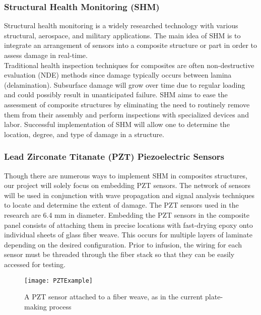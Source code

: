 \documentclass[12pt,letterpaper,notitlepage]{article}
\begin{document}
\subsubsection{Structural Health Monitoring (SHM)}
Structural health monitoring is a widely researched technology with various structural, aerospace, and military applications. The main idea of SHM is to integrate an arrangement of sensors into a composite structure or part in order to assess damage in real-time.\\

Traditional health inspection techniques for composites are often non-destructive evaluation (NDE) methods since damage typically occurs between lamina (delamination).  Subsurface damage will grow over time due to regular loading and could possibly result in unanticipated failure. SHM aims to ease the assessment of composite structures by eliminating the need to routinely remove them from their assembly and perform inspections with specialized devices and labor. Successful implementation of SHM will allow one to determine the location, degree, and type of damage in a structure.\\

\subsubsection{Lead Zirconate Titanate (PZT) Piezoelectric Sensors}
Though there are numerous ways to implement SHM in composites structures, our project will solely focus on embedding PZT sensors. The network of sensors will be used in conjunction with wave propagation and signal analysis techniques to locate and determine the extent of damage. The PZT sensors used in the research are 6.4 mm in diameter. Embedding the PZT sensors in the composite panel consists of attaching them in precise locations with fast-drying epoxy onto individual sheets of glass fiber weave. This occurs for multiple layers of laminate depending on the desired configuration. Prior to infusion, the wiring for each sensor must be threaded through the fiber stack so that they can be easily accessed for testing.
\begin{figure}[hpbt]
\centering
\texttt{[image: PZTExample]}
\caption{A PZT sensor attached to a fiber weave, as in the current plate-making process}
\label{fig:PZTExample}
\end{figure}
\end{document}

